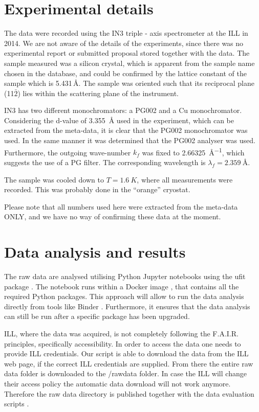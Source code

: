 \documentclass[aps,pra,reprint,amsmath,amssymb,superscriptaddress,showkeys]{revtex4-1}
\begin{document}
\section{Experimental details}

The data were recorded using the IN3 triple - axis spectrometer \cite{IN3} at the ILL in 2014.
We are not aware of the details of the experiments, since there was no experimental report or submitted proposal stored together with the data.
The sample measured was a silicon crystal, which is apparent from the sample name chosen in the database, and could be confirmed by the lattice constant of the sample which is 5.431\,\AA \cite{Hom1975}. The sample was oriented such that its reciprocal plane (11$\bar{2}$) lies within the scattering plane of the instrument.

IN3 has two different monochromators: a PG002 and a Cu monochromator.
Considering the d-value of \SI{3.355}{\mbox{\AA}} used in the experiment, which can be extracted from the meta-data, it is clear that the PG002 monochromator was used.
In the same manner it was determined that the PG002 analyser was used. 
Furthermore, the outgoing wave-number $k_f$ was fixed to \SI{2.66325}{\mbox{\AA}^{-1}}, which suggests the use of a PG filter. 
The corresponding wavelength is $\lambda_f=\SI{2.359}{\mbox{\AA}}$.

The sample was cooled down to $T = \SI{1.6}{K}$, where all measurements were recorded. 
This was probably done in the ``orange'' cryostat.

Please note that all numbers used here were extracted from the meta-data ONLY, and we have no way of confirming these data at the moment. 


\section{Data analysis and results}

The raw data are analysed utilising Python Jupyter notebooks \cite{jupyter} using the ufit package \cite{ufit}.
The notebook \cite{data-evaluation} runs within a Docker image \cite{Docker}, that contains all the required Python packages.
This approach will allow to run the data analysis \cite{data-docker} directly from tools like Binder \cite{binder}.
Furthermore, it ensures that the data analysis can still be run after a specific package has been upgraded.

ILL, where the data was acquired, is not completely following the F.A.I.R. principles, specifically accessibility. 
In order to access the data one needs to provide ILL credentials. 
Our script is able to download the data from the ILL web page, if the correct ILL credentials are supplied. 
From there the entire raw data folder is downloaded to the /rawdata folder. 
In case the ILL will change their access policy the automatic data download will not work anymore. 
Therefore the raw data directory is published together with the data evaluation scripts \cite{data-evaluation}.
\end{document}
